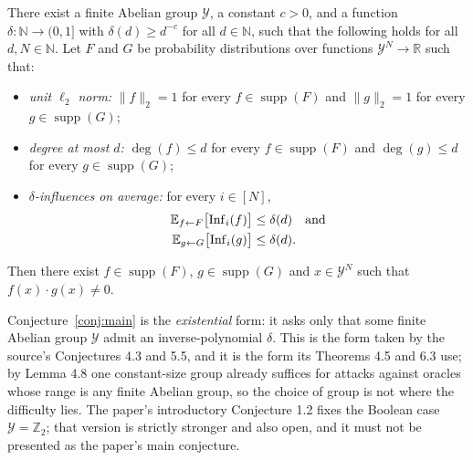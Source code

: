 \documentclass{aicr-conjecture}
\newcommand{\Yc}{\mathcal{Y}}
\begin{document}
\begin{conjecture}\label{conj:main}
There exist a finite Abelian group $\Yc$, a constant $c > 0$, and a
function $\delta \colon \mathbb{N} \to (0,1]$ with
$\delta(d) \ge d^{-c}$ for all $d \in \mathbb{N}$, such that the
following holds for all $d, N \in \mathbb{N}$. Let $F$ and $G$ be
probability distributions over functions $\Yc^N \to \mathbb{R}$ such
that:
\begin{itemize}
  \item \emph{unit $\ell_2$ norm:} $\|f\|_2 = 1$ for every
    $f \in \operatorname{supp}(F)$ and $\|g\|_2 = 1$ for every
    $g \in \operatorname{supp}(G)$;
  \item \emph{degree at most $d$:} $\deg(f) \le d$ for every
    $f \in \operatorname{supp}(F)$ and $\deg(g) \le d$ for every
    $g \in \operatorname{supp}(G)$;
  \item \emph{$\delta$-influences on average:} for every $i \in [N]$,
    \begin{align*}
      \mathbb{E}_{f \leftarrow F}\bigl[\operatorname{Inf}_i(f)\bigr]
        &\le \delta(d) \quad\text{and}\\
      \mathbb{E}_{g \leftarrow G}\bigl[\operatorname{Inf}_i(g)\bigr]
        &\le \delta(d).
    \end{align*}
\end{itemize}
Then there exist $f \in \operatorname{supp}(F)$,
$g \in \operatorname{supp}(G)$ and $x \in \Yc^N$ such that
$f(x) \cdot g(x) \ne 0$.
\end{conjecture}

\begin{remark}\label{rem:group}
Conjecture~\ref{conj:main} is the \emph{existential} form: it asks only
that some finite Abelian group $\Yc$ admit an inverse-polynomial
$\delta$. This is the form taken by the source's Conjectures 4.3 and
5.5, and it is the form its Theorems 4.5 and 6.3 use; by Lemma 4.8 one
constant-size group already suffices for attacks against oracles whose
range is any finite Abelian group, so the choice of group is not where
the difficulty lies. The paper's introductory Conjecture 1.2 fixes the
Boolean case $\Yc = \mathbb{Z}_2$; that version is strictly stronger and
also open, and it must not be presented as the paper's main conjecture.
\end{remark}
\end{document}
